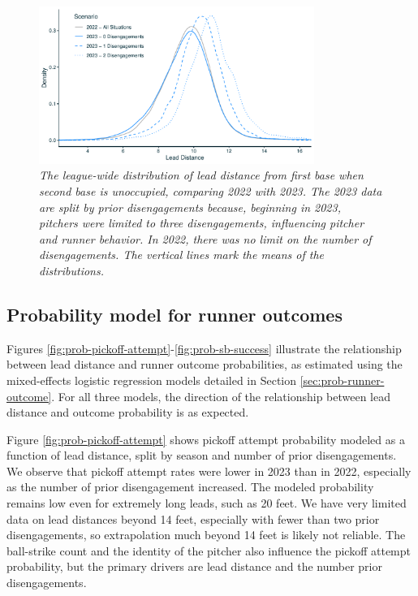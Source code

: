 \documentclass{article}
\begin{document}
      \begin{figure}
        \centering
        \includegraphics[width = 0.8\textwidth]{../../output/figures/leads_overall_light.pdf}
        \caption{
          \it The league-wide distribution of lead distance from first base when second base is unoccupied, comparing 2022 with 2023. The 2023 data are split by prior disengagements because, beginning in 2023, pitchers were limited to three disengagements, influencing pitcher and runner behavior. In 2022, there was no limit on the number of disengagements. The vertical lines mark the means of the distributions.
        }
        \label{fig:leads-overall}
      \end{figure}
      
    \subsection{Probability model for runner outcomes}

      Figures \ref{fig:prob-pickoff-attempt}-\ref{fig:prob-sb-success} illustrate the relationship between lead distance and runner outcome probabilities, as estimated using the mixed-effects logistic regression models detailed in Section \ref{sec:prob-runner-outcome}. For all three models, the direction of the relationship between lead distance and outcome probability is as expected.

      Figure \ref{fig:prob-pickoff-attempt} shows pickoff attempt probability modeled as a function of lead distance, split by season and number of prior disengagements. We observe that pickoff attempt rates were lower in 2023 than in 2022, especially as the number of prior disengagement increased. The modeled probability remains low even for extremely long leads, such as 20 feet. We have very limited data on lead distances beyond 14 feet, especially with fewer than two prior disengagements, so extrapolation much beyond 14 feet is likely not reliable. The ball-strike count and the identity of the pitcher also influence the pickoff attempt probability, but the primary drivers are lead distance and the number prior disengagements.
      
\end{document}
